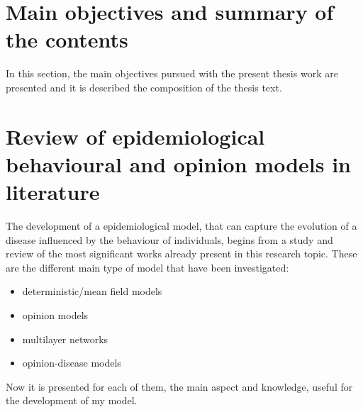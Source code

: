 \chapter{Main objectives and summary of the contents}

 In this section, the main objectives pursued with the present thesis work are presented and it is described the composition of the thesis text. 

\chapter{Review of epidemiological behavioural and opinion models in literature}

The development of a epidemiological model, that can capture the evolution of a disease influenced by the behaviour of individuals, begins from a study and review of the most significant works already present in this research topic.
These are the different main type of model that have been investigated:
\begin{itemize}
	\item deterministic/mean field models
	\item opinion models
	\item multilayer networks
	\item opinion-disease models	
\end{itemize}

Now it is presented for each of them, the main aspect and knowledge, useful for the development of my model.   

